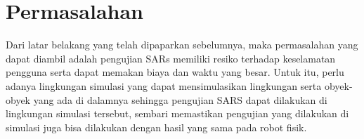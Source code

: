 \section{Permasalahan}
\label{sec:permasalahan}

Dari latar belakang yang telah dipaparkan sebelumnya,
  maka permasalahan yang dapat diambil adalah pengujian SARs memiliki resiko terhadap keselamatan pengguna serta dapat memakan biaya dan waktu yang besar.
Untuk itu, perlu adanya lingkungan simulasi yang dapat mensimulasikan lingkungan serta obyek-obyek yang ada di dalamnya sehingga pengujian SARS dapat dilakukan di lingkungan simulasi tersebut,
  sembari memastikan pengujian yang dilakukan di simulasi juga bisa dilakukan dengan hasil yang sama pada robot fisik.
